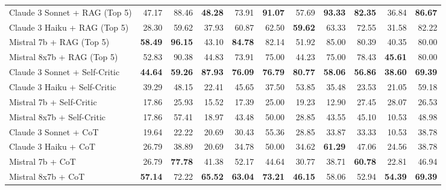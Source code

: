 \begin{table}[H]
{\begin{tabular}{lrrrrrrrrrr}
Claude 3 Sonnet + RAG (Top 5) & 47.17 & 88.46 & \textbf{48.28} & 73.91 & \textbf{91.07} & 57.69 & \textbf{93.33} & \textbf{82.35} & 36.84 & \textbf{86.67} \\
Claude 3 Haiku + RAG (Top 5) & 28.30 & 59.62 & 37.93 & 60.87 & 62.50 & \textbf{59.62} & 63.33 & 72.55 & 31.58 & 82.22 \\
Mistral 7b + RAG (Top 5) & \textbf{58.49} & \textbf{96.15} & 43.10 & \textbf{84.78} & 82.14 & 51.92 & 85.00 & 80.39 & 40.35 & 80.00 \\
Mistral 8x7b + RAG (Top 5) & 52.83 & 90.38 & 44.83 & 73.91 & 75.00 & 44.23 & 75.00 & 78.43 & \textbf{45.61} & 80.00 \\
\rowcolor{Gray}
Claude 3 Sonnet + Self-Critic & \textbf{44.64} & \textbf{59.26} & \textbf{87.93} & \textbf{76.09} & \textbf{76.79} & \textbf{80.77} & \textbf{58.06} & \textbf{56.86} & \textbf{38.60} & \textbf{69.39} \\
\rowcolor{Gray}
Claude 3 Haiku + Self-Critic & 39.29 & 48.15 & 22.41 & 45.65 & 37.50 & 53.85 & 35.48 & 23.53 & 21.05 & 59.18 \\
\rowcolor{Gray}
Mistral 7b + Self-Critic & 17.86 & 25.93 & 15.52 & 17.39 & 25.00 & 19.23 & 12.90 & 27.45 & 28.07 & 26.53 \\
\rowcolor{Gray}
Mistral 8x7b + Self-Critic & 17.86 & 57.41 & 18.97 & 43.48 & 50.00 & 28.85 & 43.55 & 45.10 & 10.53 & 48.98 \\
Claude 3 Sonnet + CoT & 19.64 & 22.22 & 20.69 & 30.43 & 55.36 & 28.85 & 33.87 & 33.33 & 10.53 & 38.78 \\
Claude 3 Haiku + CoT & 26.79 & 38.89 & 20.69 & 34.78 & 50.00 & 34.62 & \textbf{61.29} & 47.06 & 24.56 & 38.78 \\
Mistral 7b + CoT & 26.79 & \textbf{77.78} & 41.38 & 52.17 & 44.64 & 30.77 & 38.71 & \textbf{60.78} & 22.81 & 46.94 \\
Mistral 8x7b + CoT & \textbf{57.14} & 72.22 & \textbf{65.52} & \textbf{63.04} & \textbf{73.21} & \textbf{46.15} & 58.06 & 52.94 & \textbf{54.39} & \textbf{69.39} \\
\bottomrule
\end{tabular}
}


\end{table}
